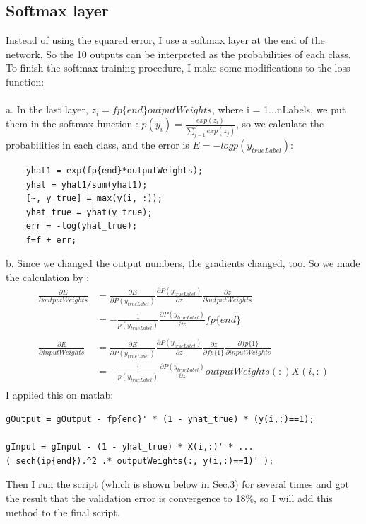 \documentclass[12pt]{article}
\begin{document}
\subsection{Softmax layer}
Instead of using the squared error, I  use a softmax layer at the end of the network. So the 10 outputs can be interpreted as the probabilities of each class. To finish the softmax training procedure, I make some modifications to the loss function:\\
\\
a. In the last layer, $z_i = fp\{end\} outputWeights$, where i = 1...nLabels, we put them in the softmax function : $p(y_i) = \frac{exp(z_i)}{\sum_{j=1}^J exp(z_j)}$, so we calculate the probabilities in each class, and the error is $E = -logp(y_{trueLabel})$:
\begin{lstlisting}
    yhat1 = exp(fp{end}*outputWeights);
    yhat = yhat1/sum(yhat1);
    [~, y_true] = max(y(i, :));
    yhat_true = yhat(y_true);
    err = -log(yhat_true);
    f=f + err;
\end{lstlisting}
b. Since we changed the output numbers, the gradients changed, too. So we made the calculation by :
\begin{align*}
\frac{\partial{E}}{\partial{outputWeights}} 
& = \frac{\partial{E}}{\partial{P(y_{trueLabel})}} \frac{{\partial{P(y_{trueLabel})}}}{\partial{z}} \frac{\partial{z}}{\partial{outputWeights}}\\
& = -\frac{1}{p(y_{trueLabel})} \frac{{\partial{P(y_{trueLabel})}}}{\partial{z}}  fp\{end\}\\
\\
\frac{\partial{E}}{\partial{inputWeights}}
&= \frac{\partial{E}}{\partial{P(y_{trueLabel})}} \frac{{\partial{P(y_{trueLabel})}}}{\partial{z}} \frac{\partial{z}}{\partial{fp\{1\}}} \frac{\partial{fp\{1\}}}{\partial{inputWeights}}\\
& = -\frac{1}{p(y_{trueLabel})} \frac{{\partial{P(y_{trueLabel})}}}{\partial{z}} outputWeights(:) X(i, :)\\
\end{align*} 
I applied this on matlab:
\begin{lstlisting}
gOutput = gOutput - fp{end}' * (1 - yhat_true) * (y(i,:)==1);

gInput = gInput - (1 - yhat_true) * X(i,:)' * ...
( sech(ip{end}).^2 .* outputWeights(:, y(i,:)==1)' );
\end{lstlisting}
Then I run the script (which is shown below in Sec.3) for several times and got the result that the validation error is convergence to 18\%, so I will add this method to the final script.
\end{document}

